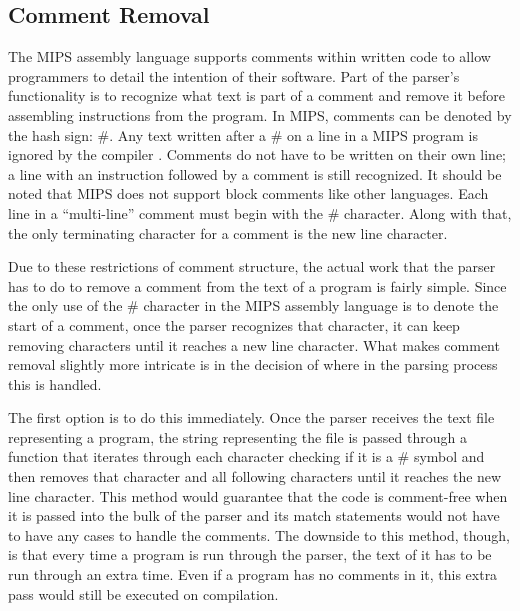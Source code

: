 \documentclass[
    parskip=half,
    fontsize=12pt,
    titlepage=firstiscover,
    toc=bibliography,
    numbers=endperiod
]{scrartcl}
\begin{document}
\subsection{Comment Removal}

The MIPS assembly language supports comments within written code to
allow programmers to detail the intention of their software. Part of the
parser's functionality is to recognize what text is part of a comment
and remove it before assembling instructions from the program. In MIPS,
comments can be denoted by the hash sign: \#. Any text written after a
\# on a line in a MIPS program is ignored by the compiler
\cite{wikibooks-mips-instructions}. Comments do not have to be written
on their own line; a line with an instruction followed by a comment is
still recognized. It should be noted that MIPS does not support block
comments like other languages. Each line in a ``multi-line'' comment
must begin with the \# character. Along with that, the only terminating
character for a comment is the new line character.

Due to these restrictions of comment structure, the actual work that the
parser has to do to remove a comment from the text of a program is
fairly simple. Since the only use of the \# character in the MIPS
assembly language is to denote the start of a comment, once the parser
recognizes that character, it can keep removing characters until it
reaches a new line character. What makes comment removal slightly more
intricate is in the decision of where in the parsing process this is
handled.

The first option is to do this immediately. Once the parser receives the
text file representing a program, the string representing the file is
passed through a function that iterates through each character checking
if it is a \# symbol and then removes that character and all following
characters until it reaches the new line character. This method would
guarantee that the code is comment-free when it is passed into the bulk
of the parser and its match statements would not have to have any cases
to handle the comments. The downside to this method, though, is that
every time a program is run through the parser, the text of it has to be
run through an extra time. Even if a program has no comments in it, this
extra pass would still be executed on compilation.
\end{document}
